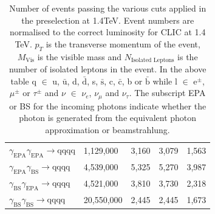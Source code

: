 \begin{table}[h!]
\begin{tabular}{ l l l l l}
$\gamma_{\text{EPA}}\gamma_{\text{EPA}} \rightarrow \text{qqqq}$ & 1,129,000 & 3,160 & 3,079 & 1,563\\
$\gamma_{\text{EPA}}\gamma_{\text{BS}} \rightarrow \text{qqqq}$ & 4,539,000 & 5,325 & 5,270 & 3,987\\
$\gamma_{\text{BS}}\gamma_{\text{EPA}} \rightarrow \text{qqqq}$ & 4,521,000 & 3,810 & 3,730 & 2,318\\
$\gamma_{\text{BS}}\gamma_{\text{BS}} \rightarrow \text{qqqq}$ & 20,550,000 & 2,445 & 2,445 & 1,673\\
\hline
\end{tabular}
\caption[Number of events passing the various cuts applied in the preselection at 1.4TeV.]{Number of events passing the various cuts applied in the preselection at 1.4TeV.  Event numbers are normalised to the correct luminosity for CLIC at 1.4 TeV.  $p_{T}$ is the transverse momentum of the event,  $M_{\text{Vis}}$ is the visible mass and $N_{\text{Isolated Leptons}}$ is the number of isolated leptons in the event.  In the above table q $\in$ u, $\bar{\text{u}}$, d, $\bar{\text{d}}$, s, $\bar{\text{s}}$, c, $\bar{\text{c}}$, b or $\bar{\text{b}}$ while l $\in$ $\text{e}^{\pm}$, $\mu^{\pm}$ or $\tau^{\pm}$ and $\nu$ $\in$ $\nu_{e}$, $\nu_{\mu}$ and $\nu_{\tau}$.  The subscript EPA or BS for the incoming photons indicate whether the photon is generated from the equivalent photon approximation or beamstrahlung.}
\label{table:preselectionnumbers1400GeV}
\end{table}

